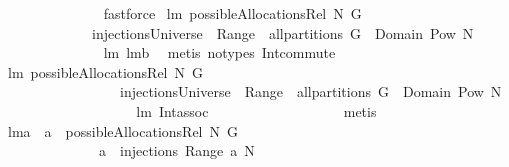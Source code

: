 \begin{isabellebody}
%
\isadelimproof
\ \ \ \ \ \ \ \ \ \ \ \ \ %
\endisadelimproof
%
\isatagproof
{}\isamarkupfalse%
\ fastforce%
\endisatagproof
{\isafoldproof}%
%
\isadelimproof
\isanewline
%
\endisadelimproof
\isanewline
{}\isamarkupfalse%
\ lm{}{}{\isacharcolon}\ {\isachardoublequoteopen}possibleAllocationsRel\ N\ G\ {\isacharequal}\ \isanewline
\ \ \ \ \ \ \ \ \ \ \ \ \ injectionsUniverse\ {\isasyminter}\ {\isacharparenleft}{\isacharparenleft}Range\ {\isacharminus}{\isacharbackquote}\ {\isacharparenleft}all{\isacharunderscore}partitions\ G{\isacharparenright}{\isacharparenright}\ {\isasyminter}\ {\isacharparenleft}Domain\ {\isacharminus}{\isacharbackquote}{\isacharparenleft}Pow\ N{\isacharparenright}{\isacharparenright}{\isacharparenright}{\isachardoublequoteclose}\isanewline
%
\isadelimproof
\ \ \ \ \ \ \ \ \ \ \ \ \ %
\endisadelimproof
%
\isatagproof
{}\isamarkupfalse%
\ lm{}{}\ lm{}{}b\ \isamarkupfalse%
\ {\isacharparenleft}metis\ {\isacharparenleft}no{\isacharunderscore}types{\isacharparenright}\ Int{\isacharunderscore}commute{\isacharparenright}%
\endisatagproof
{\isafoldproof}%
%
\isadelimproof
\isanewline
%
\endisadelimproof
\isanewline
\isanewline
{}\isamarkupfalse%
\ lm{}{}{\isacharcolon}\ {\isachardoublequoteopen}possibleAllocationsRel\ N\ G\ {\isacharequal}\ \isanewline
\ \ \ \ \ \ \ \ \ \ \ \ \ \ \ \ \ injectionsUniverse\ {\isasyminter}\ {\isacharparenleft}Range\ {\isacharminus}{\isacharbackquote}\ {\isacharparenleft}all{\isacharunderscore}partitions\ G{\isacharparenright}{\isacharparenright}\ {\isasyminter}\ {\isacharparenleft}Domain\ {\isacharminus}{\isacharbackquote}{\isacharparenleft}Pow\ N{\isacharparenright}{\isacharparenright}{\isachardoublequoteclose}\ \isanewline
%
\isadelimproof
\ \ \ \ \ \ \ \ \ \ \ \ \ \ \ \ %
\endisadelimproof
%
\isatagproof
{}\isamarkupfalse%
\ lm{}{}\ Int{\isacharunderscore}assoc\ \isanewline
\ \ \ \ \ \ \ \ \ \ \ \ \ \ \ \ \isamarkupfalse%
\ {\isacharparenleft}metis{\isacharparenright}%
\endisatagproof
{\isafoldproof}%
%
\isadelimproof
\isanewline
%
\endisadelimproof
\isanewline
{}\isamarkupfalse%
\ lm{}{}a{\isacharcolon}\ \ {\isachardoublequoteopen}a\ {\isasymin}\ possibleAllocationsRel\ N\ G{\isachardoublequoteclose}\ \isanewline
\ \ \ \ \ \ \ \ \ \ \ \ \ \ {\isachardoublequoteopen}{\isacharparenleft}a{\isacharcircum}{\isacharminus}{}\ {\isasymin}\ injections\ {\isacharparenleft}Range\ a{\isacharparenright}\ N\ {\isacharampersand}\ \isanewline

\end{isabellebody}

